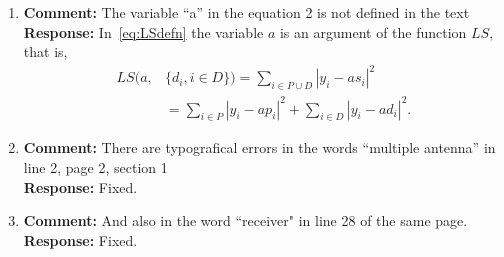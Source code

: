 \documentclass{article}
\newcommand{\abs}[1]{{\left\vert #1 \right\vert}}
\begin{document}
\begin{enumerate}

\item \textbf{Comment:}  The variable  ``a'' in the equation 2 is not defined in the text \\
\textbf{Response:} In~\eqref{eq:LSdefn} the variable $a$ is an argument of the function $LS$, that is,
\[
\begin{split}
LS(a, &\{d_i, i \in D\}) = \sum_{i \in P \cup D} \abs{ y_i - a s_i }^2  \\
&= \sum_{i \in P} \abs{ y_i - a p_i }^2 + \sum_{i \in D} \abs{ y_i - a d_i }^2.
\end{split}
\]

\item \textbf{Comment:}  There are typografical errors in the words  ``multiple antenna'' in line 2, page 2, section 1 \\
\textbf{Response:} Fixed.

\item \textbf{Comment:}  And also in the word ``receiver" in line 28 of the same page.
 \\
\textbf{Response:} Fixed.


\end{enumerate}

{
\small

}
\end{document}
